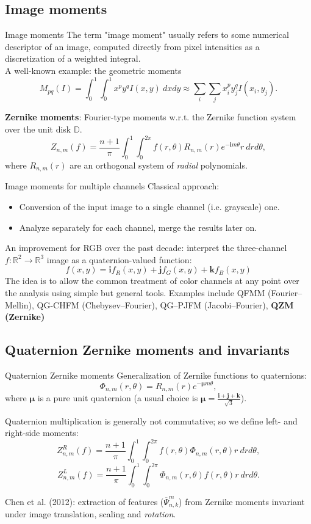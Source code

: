 \documentclass{beamer}
\newcommand{\R}{\mathbb{R}}
\newcommand{\D}{\mathbb{D}}
\newcommand{\qi}{\textbf{i}}
\newcommand{\qj}{\textbf{j}}
\newcommand{\qk}{\textbf{k}}
\newcommand{\qmu}{\boldsymbol{\mu}}
\def\R{{\mathbb R}}
\def\D{{\mathbb D}}
\begin{document}
\subsection{Image moments}
\begin{frame}{Image moments}
\vskip 3mm
The term "image moment" usually refers to some numerical descriptor of an image, computed directly from pixel intensities as a discretization of a weighted integral.\\
A well-known example: the geometric moments $$M_{pq}(I) = \int_0^1 \int_0^1 x^p y^q I(x,y)\ dx dy \approx
\sum_i \sum_j x_i^p y_j^q I(x_i,y_j).$$

\textbf{Zernike moments}: Fourier-type moments w.r.t. the Zernike function system over the unit disk $\D$.
$$Z_{n,m}(f) = \frac{n+1}{\pi}\int_0^1\int_0^{2\pi}f(r,\theta)R_{n,m}(r)e^{-\qi m\theta} r\ dr d\theta,$$ where $R_{n,m}(r)$ are an orthogonal system of \emph{radial} polynomials.
\end{frame}


\begin{frame}{Image moments for multiple channels}
\vskip 3mm
Classical approach:
\begin{itemize}
    \item Conversion of the input image to a single channel (i.e. grayscale) one.
    \item Analyze separately for each channel, merge the results later on.
\end{itemize}
An improvement for RGB over the past decade: interpret the three-channel $f : \R^2 \rightarrow \R^3$ image as a quaternion-valued function:
$$f(x,y) = \qi f_R(x,y) + \qj f_G(x,y) + \qk f_B(x,y)$$
The idea is to allow the common treatment of color channels at any point over the analysis using simple but general tools.
Examples include QFMM (Fourier--Mellin), QG-CHFM (Chebysev--Fourier), QG--PJFM (Jacobi--Fourier), \textbf{QZM (Zernike)}
\end{frame}

\subsection{Quaternion Zernike moments and invariants}
\begin{frame}{Quaternion Zernike moments}
\vskip 3mm
Generalization of Zernike functions to quaternions: $$\Phi_{n,m}(r,\theta) = R_{n,m}(r)e^{-\qmu m \theta},$$ where $\qmu$ is a pure unit quaternion (a usual choice is $\qmu = \frac{\qi + \qj + \qk}{\sqrt{3}}$).

Quaternion multiplication is generally not commutative; so we define left- and right-side moments:
$$Z^R_{n,m}(f) = \frac{n+1}{\pi}\int_0^1\int_0^{2\pi}f(r,\theta)\Phi_{n,m}(r,\theta)r\ dr d\theta,$$
$$Z^L_{n,m}(f) = \frac{n+1}{\pi}\int_0^1\int_0^{2\pi}\Phi_{n,m}(r,\theta)f(r,\theta)r\ dr d\theta.$$

Chen et al. (2012): extraction of features ($\overline{\Psi}_{n,k}^m$) from Zernike moments invariant under image translation, scaling and \emph{rotation}. 
\end{frame}
\end{document}

